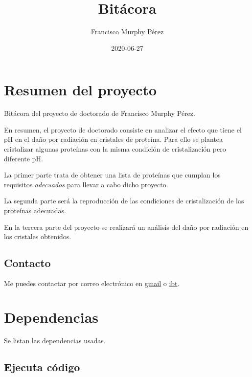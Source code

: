 \documentclass[
]{book}
\title{Bitácora}
\author{Francisco Murphy Pérez}
\date{2020-06-27}
\newenvironment{Shaded}{\begin{snugshade}}{\end{snugshade}}
\newcommand{\CommentTok}[1]{\textcolor[rgb]{0.56,0.35,0.01}{\textit{#1}}}
\begin{document}
\maketitle

{
\setcounter{tocdepth}{1}
\tableofcontents
}
\hypertarget{resumen-del-proyecto}{%
\chapter{Resumen del proyecto}\label{resumen-del-proyecto}}

Bitácora del proyecto de doctorado de Francisco Murphy Pérez.

En resumen, el proyecto de doctorado consiste en analizar el efecto que tiene el pH en el daño por radiación en cristales de proteína. Para ello se plantea cristalizar algunas proteínas con la misma condición de cristalización pero diferente pH.

La primer parte trata de obtener una lista de proteínas que cumplan los requisitos \emph{adecuados} para llevar a cabo dicho proyecto.

La segunda parte será la reproducción de las condiciones de cristalización de las proteínas adecuadas.

En la tercera parte del proyecto se realizará un análisis del daño por radiación en los cristales obtenidos.

\hypertarget{contacto}{%
\section{Contacto}\label{contacto}}

Me puedes contactar por correo electrónico en \href{mailto:murpholinox@gmail.com}{gmail} o \href{mailto:murphy@ibt.unam.mx}{ibt}.

\hypertarget{dependencias}{%
\chapter{Dependencias}\label{dependencias}}

Se listan las dependencias usadas.

\hypertarget{ejecuta-cuxf3digo}{%
\section{Ejecuta código}\label{ejecuta-cuxf3digo}}

\begin{Shaded}
\end{Shaded}
\end{document}
